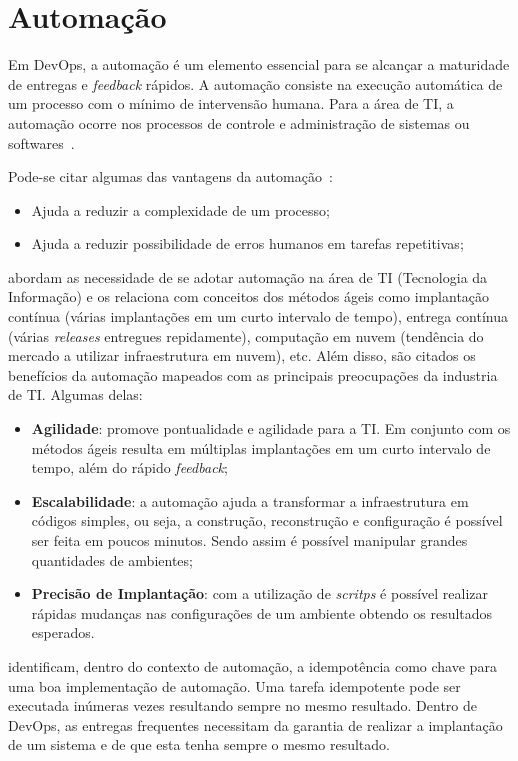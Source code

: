 \section{Automação}
\label{sec:auto}

Em DevOps, a automação é um elemento essencial para se alcançar a maturidade
de entregas e \textit{feedback} rápidos. A automação consiste na execução
automática de um processo com o mínimo de intervensão humana. Para a área
de TI, a automação ocorre nos processos de controle e administração de
sistemas ou softwares~\cite{sharma:2015}.

Pode-se citar algumas das vantagens da automação~\cite{sharma:2015}:
\begin{itemize}
  \item Ajuda a reduzir a complexidade de um processo;
  \item Ajuda a reduzir possibilidade de erros humanos em tarefas
    repetitivas;
\end{itemize}

 abordam as necessidade de se adotar automação na área
de TI (Tecnologia da Informação) e os relaciona com conceitos dos métodos ágeis como
implantação contínua (várias implantações em um curto intervalo de tempo), entrega contínua (várias
\textit{releases} entregues repidamente), computação em nuvem (tendência do mercado a
utilizar infraestrutura em nuvem), etc. Além disso, são citados os benefícios da
automação mapeados com as principais preocupações da industria de TI. Algumas delas:

\begin{itemize}
  \item \textbf{Agilidade}: promove pontualidade e agilidade para a TI. Em conjunto
    com os métodos ágeis resulta em múltiplas implantações em um curto intervalo
    de tempo, além do rápido \textit{feedback};
  \item \textbf{Escalabilidade}: a automação ajuda a transformar a infraestrutura
    em códigos simples, ou seja, a construção, reconstrução e configuração é possível
    ser feita em poucos minutos. Sendo assim é possível manipular grandes quantidades
    de ambientes;
  \item \textbf{Precisão de Implantação}: com a utilização de \textit{scritps}
    é possível realizar rápidas mudanças nas configurações de um ambiente
    obtendo os resultados esperados.
\end{itemize}

 identificam, dentro do contexto de automação, a idempotência
como chave para uma boa implementação de automação. Uma tarefa idempotente pode ser
executada inúmeras vezes resultando sempre no mesmo resultado. Dentro de DevOps,
as entregas frequentes necessitam da garantia de realizar a implantação de um
sistema e de que esta tenha sempre o mesmo resultado.

